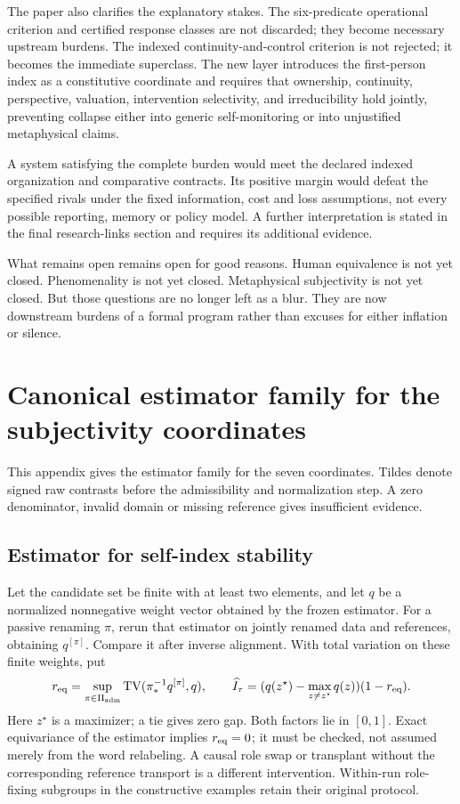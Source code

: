 \documentclass[11pt,a4paper]{article}
\theoremstyle{definition}
\newcommand{\SelfIndex}{I}
\begin{document}
The paper also clarifies the explanatory stakes. The six-predicate operational criterion and certified response classes are not discarded; they become necessary upstream burdens. The indexed continuity-and-control criterion is not rejected; it becomes the immediate superclass. The new layer introduces the first-person index as a constitutive coordinate and requires that ownership, continuity, perspective, valuation, intervention selectivity, and irreducibility hold jointly, preventing collapse either into generic self-monitoring or into unjustified metaphysical claims.

A system satisfying the complete burden would meet the declared indexed organization and comparative contracts. Its positive margin would defeat the specified rivals under the fixed information, cost and loss assumptions, not every possible reporting, memory or policy model. A further interpretation is stated in the final research-links section and requires its additional evidence.

What remains open remains open for good reasons. Human equivalence is not yet closed. Phenomenality is not yet closed. Metaphysical subjectivity is not yet closed. But those questions are no longer left as a blur. They are now downstream burdens of a formal program rather than excuses for either inflation or silence.

\appendix

\section{Canonical estimator family for the subjectivity coordinates}\label{sec:canonical-subjectivity-estimators}
This appendix gives the estimator family for the seven coordinates. Tildes denote signed raw contrasts before the admissibility and normalization step. A zero denominator, invalid domain or missing reference gives insufficient evidence.

\subsection{Estimator for self-index stability}
Let the candidate set be finite with at least two elements, and let $q$ be a normalized nonnegative weight vector obtained by the frozen estimator. For a passive renaming $\pi$, rerun that estimator on jointly renamed data and references, obtaining $q^{[\pi]}$. Compare it after inverse alignment. With total variation on these finite weights, put
\[
 r_{\rm eq}=\sup_{\pi\in\Pi_{\rm adm}}\operatorname{TV}(\pi^{-1}_*q^{[\pi]},q),
 \qquad \widehat{\SelfIndex}_\tau=(q(z^\star)-\max_{z\ne z^\star}q(z))(1-r_{\rm eq}).
\]
Here $z^\star$ is a maximizer; a tie gives zero gap. Both factors lie in $[0,1]$. Exact equivariance of the estimator implies $r_{\rm eq}=0$; it must be checked, not assumed merely from the word relabeling. A causal role swap or transplant without the corresponding reference transport is a different intervention. Within-run role-fixing subgroups in the constructive examples retain their original protocol.
\end{document}
